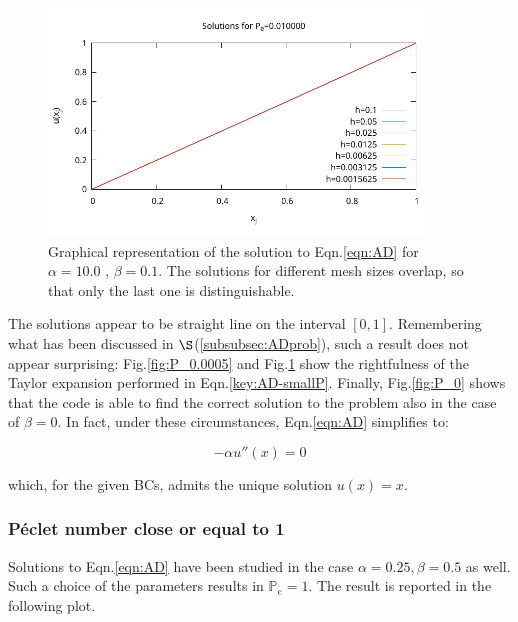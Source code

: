 \documentclass[11pt]{article}
\theoremstyle{theorem}
\theoremstyle{definition}
\begin{document}
\begin{figure}[H]
	\begin{center}
		\includegraphics[width=0.9\textwidth]{ADRsol4.pdf}
	\end{center}
	\caption{Graphical representation of the solution to Eqn.\eqref{eqn:AD} for $\alpha=10.0$ , $\beta=0.1$. The solutions for different mesh sizes overlap, so that only the last one is distinguishable.
		\label{fig:P_0.01}}
\end{figure} 

The solutions appear to be straight line on the interval $[0, 1]$. Remembering what has been discussed in $\S$(\ref{subsubsec:ADprob}), such a result does not appear surprising: Fig.\ref{fig:P_0.0005} and Fig.\ref{fig:P_0.01} show the rightfulness of the Taylor expansion performed in Eqn.\eqref{key:AD-smallP}. Finally, Fig.\ref{fig:P_0} shows that the code is able to find the correct solution to the problem also in the case of $\beta=0$. In fact, under these circumstances, Eqn.\eqref{eqn:AD} simplifies to:

$$-\alpha u''(x)=0$$

which, for the given BCs, admits the unique solution $u(x)=x$.\\

\subsubsection{P\'{e}clet number close or equal to 1}
Solutions to Eqn.\eqref{eqn:AD} have been studied in the case $\alpha=0.25, \beta=0.5$ as well. Such a choice of the parameters results in $\mathbb{P}_e=1$. The result is reported in the following plot.
\end{document}
